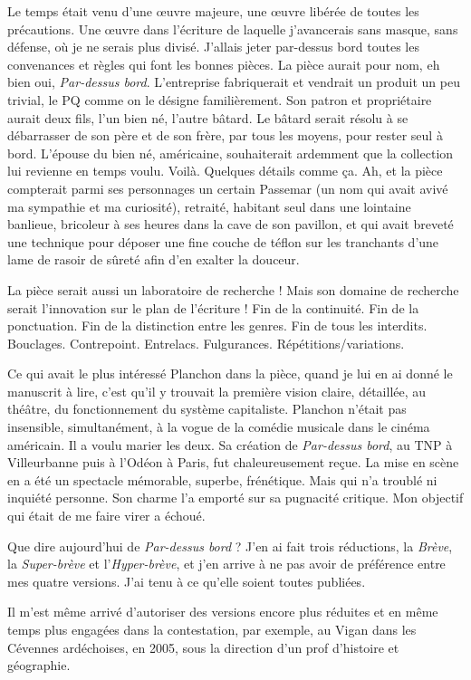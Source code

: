 \documentclass[a4paper]{report}
\newcounter{rem}[chapter]
\newcounter{sol}[chapter]
\begin{document}
Le temps était venu d'une œuvre majeure, une œuvre libérée de toutes les précautions. Une œuvre dans l'écriture de laquelle j'avancerais sans masque, sans défense, où je ne serais plus divisé. J'allais jeter par-dessus bord toutes les convenances et règles qui font les bonnes pièces. La pièce aurait pour nom, eh bien oui, \textit{Par-dessus bord}. L'entreprise fabriquerait et vendrait un produit un peu trivial, le PQ comme on le désigne familièrement. Son patron et propriétaire aurait deux fils, l'un bien né, l'autre bâtard. Le bâtard serait résolu à se débarrasser de son père et de son frère, par tous les moyens, pour rester seul à bord. L'épouse du bien né, américaine, souhaiterait ardemment que la collection lui revienne en temps voulu. Voilà. Quelques détails comme ça. Ah, et la pièce compterait parmi ses personnages un certain Passemar (un nom qui avait avivé ma sympathie et ma curiosité), retraité, habitant seul dans une lointaine banlieue, bricoleur à ses heures dans la cave de son pavillon, et qui avait breveté une technique pour déposer une fine couche de téflon sur les tranchants d'une lame de rasoir de sûreté afin d'en exalter la douceur.

La pièce serait aussi un laboratoire de recherche ! Mais son domaine de recherche serait l'innovation sur le plan de l'écriture ! Fin de la continuité. Fin de la ponctuation. Fin de la distinction entre les genres. Fin de tous les interdits. Bouclages. Contrepoint. Entrelacs. Fulgurances. Répétitions/variations.

Ce qui avait le plus intéressé Planchon dans la pièce, quand je lui en ai donné le manuscrit à lire, c'est qu'il y trouvait la première vision claire, détaillée, au théâtre, du fonctionnement du système capitaliste. Planchon n'était pas insensible, simultanément, à la vogue de la comédie musicale dans le cinéma américain. Il a voulu marier les deux. Sa création de \textit{Par-dessus bord}, au TNP à Villeurbanne puis à l'Odéon à Paris, fut chaleureusement reçue. La mise en scène en a été un spectacle mémorable, superbe, frénétique. Mais qui n'a troublé ni inquiété personne. Son charme l'a emporté sur sa pugnacité critique. Mon objectif qui était de me faire virer a échoué.

Que dire aujourd'hui de \textit{Par-dessus bord} ? J'en ai fait trois réductions, la \textit{Brève}, la \textit{Super-brève} et l'\textit{Hyper-brève}, et j'en arrive à ne pas avoir de préférence entre mes quatre versions. J'ai tenu à ce qu'elle soient toutes publiées.

Il m'est même arrivé d'autoriser des versions encore plus réduites et en même temps plus engagées dans la contestation, par exemple, au Vigan dans les Cévennes ardéchoises, en 2005, sous la direction d'un prof d'histoire et géographie.
\end{document}
